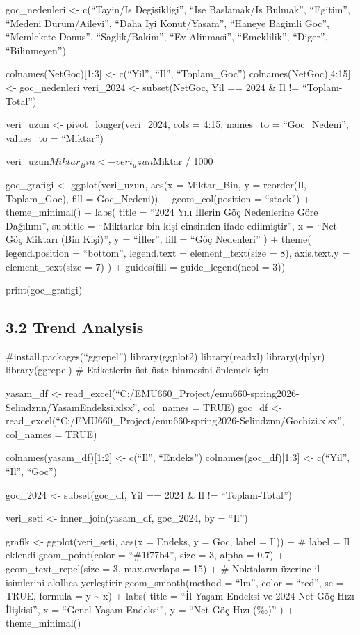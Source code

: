 \documentclass[
  11pt,
  a4paper,
  DIV=11,
  numbers=noendperiod]{scrartcl}
\begin{document}
goc\_nedenleri \textless- c(``Tayin/Is Degisikligi'', ``Ise Baslamak/Is
Bulmak'', ``Egitim'', ``Medeni Durum/Ailevi'', ``Daha Iyi Konut/Yasam'',
``Haneye Bagimli Goc'', ``Memlekete Donus'', ``Saglik/Bakim'', ``Ev
Alinmasi'', ``Emeklilik'', ``Diger'', ``Bilinmeyen'')

colnames(NetGoc){[}1:3{]} \textless- c(``Yil'', ``Il'', ``Toplam\_Goc'')
colnames(NetGoc){[}4:15{]} \textless- goc\_nedenleri veri\_2024
\textless- subset(NetGoc, Yil == 2024 \& Il != ``Toplam-Total'')

veri\_uzun \textless- pivot\_longer(veri\_2024, cols = 4:15, names\_to =
``Goc\_Nedeni'', values\_to = ``Miktar'')

veri\_uzun\(Miktar_Bin <- veri_uzun\)Miktar / 1000

goc\_grafigi \textless- ggplot(veri\_uzun, aes(x = Miktar\_Bin, y =
reorder(Il, Toplam\_Goc), fill = Goc\_Nedeni)) + geom\_col(position =
``stack'') + theme\_minimal() + labs( title = ``2024 Yılı İllerin Göç
Nedenlerine Göre Dağılımı'', subtitle = ``Miktarlar bin kişi cinsinden
ifade edilmiştir'', x = ``Net Göç Miktarı (Bin Kişi)'', y = ``İller'',
fill = ``Göç Nedenleri'' ) + theme( legend.position = ``bottom'',
legend.text = element\_text(size = 8), axis.text.y = element\_text(size
= 7) ) + guides(fill = guide\_legend(ncol = 3))

print(goc\_grafigi)

\subsection{3.2 Trend Analysis}\label{trend-analysis}

\#install.packages(``ggrepel'') library(ggplot2) library(readxl)
library(dplyr) library(ggrepel) \# Etiketlerin üst üste binmesini
önlemek için

yasam\_df \textless-
read\_excel(``C:/EMU660\_Project/emu660-spring2026-Selindznn/YasamEndeksi.xlsx'',
col\_names = TRUE) goc\_df \textless-
read\_excel(``C:/EMU660\_Project/emu660-spring2026-Selindznn/Gochizi.xlsx'',
col\_names = TRUE)

colnames(yasam\_df){[}1:2{]} \textless- c(``Il'', ``Endeks'')
colnames(goc\_df){[}1:3{]} \textless- c(``Yil'', ``Il'', ``Goc'')

goc\_2024 \textless- subset(goc\_df, Yil == 2024 \& Il !=
``Toplam-Total'')

veri\_seti \textless- inner\_join(yasam\_df, goc\_2024, by = ``Il'')

grafik \textless- ggplot(veri\_seti, aes(x = Endeks, y = Goc, label =
Il)) + \# label = Il eklendi geom\_point(color = ``\#1f77b4'', size = 3,
alpha = 0.7) + geom\_text\_repel(size = 3, max.overlaps = 15) + \#
Noktaların üzerine il isimlerini akıllıca yerleştirir
geom\_smooth(method = ``lm'', color = ``red'', se = TRUE, formula = y
\textasciitilde{} x) + labs( title = ``İl Yaşam Endeksi ve 2024 Net Göç
Hızı İlişkisi'', x = ``Genel Yaşam Endeksi'', y = ``Net Göç Hızı (‰)'' )
+ theme\_minimal()
\end{document}
